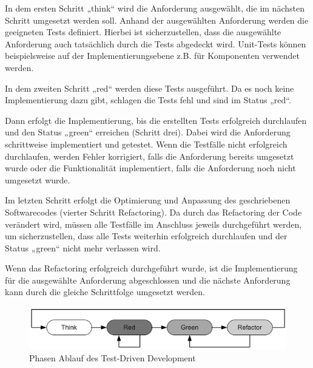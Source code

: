 In dem ersten Schritt „think“ wird die Anforderung ausgewählt, die im nächsten Schritt umgesetzt werden soll. Anhand der ausgewählten Anforderung werden die geeigneten Tests definiert. Hierbei ist sicherzustellen, dass die ausgewählte Anforderung auch tatsächlich durch die Tests abgedeckt wird. Unit-Tests können beispielsweise auf der Implementierungsebene z.B. für Komponenten verwendet werden. \cite[S. 153]{schatten_best_2010}

In dem zweiten Schritt „red“ werden diese Tests ausgeführt. Da es noch keine Implementierung dazu gibt, schlagen die Tests fehl und sind im Status „red“. \cite[S. 153]{schatten_best_2010}

Dann erfolgt die Implementierung, bis die erstellten Tests erfolgreich durchlaufen und den Status „green“ erreichen (Schritt drei). Dabei wird die Anforderung schrittweise implementiert und getestet. Wenn die Testfälle nicht erfolgreich durchlaufen, werden Fehler korrigiert, falls die Anforderung bereits umgesetzt wurde oder die Funktionalität implementiert, falls die Anforderung noch nicht umgesetzt wurde. \cite[S. 153]{schatten_best_2010}

Im letzten Schritt erfolgt die Optimierung und Anpassung des geschriebenen Softwarecodes (vierter Schritt Refactoring). Da durch das Refactoring der Code verändert wird, müssen alle Testfälle im Anschluss jeweils durchgeführt werden, um sicherzustellen, dass alle Tests weiterhin erfolgreich durchlaufen und der Status „green“ nicht mehr verlassen wird. \cite[S. 153]{schatten_best_2010}

Wenn das Refactoring erfolgreich durchgeführt wurde, ist die Implementierung für die ausgewählte Anforderung abgeschlossen und die nächste Anforderung kann durch die gleiche Schrittfolge umgesetzt werden. \cite[S. 153 f.]{schatten_best_2010} 

\begin{figure}[h]
	\centering
	\includegraphics[clip,width=1\linewidth]{images/Phasen des TDD.png}
	\caption[Phasen des Test-Driven Development]{Phasen Ablauf des Test-Driven Development \cite[S. 153]{schatten_best_2010}}
	\label{Phasen des TDD}
\end{figure}

